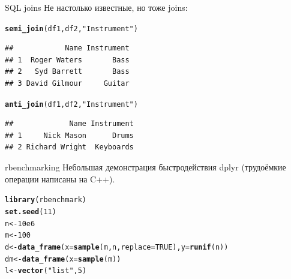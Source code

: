 \documentclass[compress, ucs]{beamer}\usepackage[]{graphicx}\usepackage[]{color}
\makeatletter
\newcommand{\hlnum}[1]{\textcolor[rgb]{0.686,0.059,0.569}{#1}}%
\newcommand{\hlstr}[1]{\textcolor[rgb]{0.192,0.494,0.8}{#1}}%
\newcommand{\hlstd}[1]{\textcolor[rgb]{0.345,0.345,0.345}{#1}}%
\newcommand{\hlkwb}[1]{\textcolor[rgb]{0.69,0.353,0.396}{#1}}%
\newcommand{\hlkwc}[1]{\textcolor[rgb]{0.333,0.667,0.333}{#1}}%
\newcommand{\hlkwd}[1]{\textcolor[rgb]{0.737,0.353,0.396}{\textbf{#1}}}%
\newenvironment{kframe}{%
 \def\at@end@of@kframe{}%
 \ifinner\ifhmode%
  \def\at@end@of@kframe{\end{minipage}}%
  \begin{minipage}{\columnwidth}%
 \fi\fi%
 \def\FrameCommand##1{\hskip\@totalleftmargin \hskip-\fboxsep
 \colorbox{shadecolor}{##1}\hskip-\fboxsep
     \hskip-\linewidth \hskip-\@totalleftmargin \hskip\columnwidth}%
 \MakeFramed {\advance\hsize-\width
   \@totalleftmargin\z@ \linewidth\hsize
   \@setminipage}}%
 {\par\unskip\endMakeFramed%
 \at@end@of@kframe}
\newenvironment{knitrout}{}{} %
\makeatother
\begin{document}
\begin{frame}[fragile]{SQL joins}
Не настолько известные, но тоже joins:
\begin{knitrout}\scriptsize
{}\color{fgcolor}\begin{kframe}
\begin{alltt}
\hlkwd{semi_join}\hlstd{(df1, df2,} \hlstr{"Instrument"}\hlstd{)}
\end{alltt}
\begin{verbatim}
##            Name Instrument
## 1  Roger Waters       Bass
## 2   Syd Barrett       Bass
## 3 David Gilmour     Guitar
\end{verbatim}
\begin{alltt}
\hlkwd{anti_join}\hlstd{(df1, df2,} \hlstr{"Instrument"}\hlstd{)}
\end{alltt}
\begin{verbatim}
##             Name Instrument
## 1     Nick Mason      Drums
## 2 Richard Wright  Keyboards
\end{verbatim}
\end{kframe}
\end{knitrout}
\end{frame}
\begin{frame}[fragile]{rbenchmarking}
Небольшая демонстрация быстродействия dplyr (трудоёмкие операции написаны на C++).
\begin{knitrout}\scriptsize
{}\color{fgcolor}\begin{kframe}
\begin{alltt}
\hlkwd{library}\hlstd{(rbenchmark)}
\hlkwd{set.seed}\hlstd{(}\hlnum{11}\hlstd{)}
\hlstd{n} \hlkwb{<-} \hlnum{10e6}
\hlstd{m} \hlkwb{<-} \hlnum{100}
\hlstd{d} \hlkwb{<-} \hlkwd{data_frame}\hlstd{(}\hlkwc{x} \hlstd{=} \hlkwd{sample}\hlstd{(m, n,} \hlkwc{replace}\hlstd{=}\hlnum{TRUE}\hlstd{),} \hlkwc{y} \hlstd{=} \hlkwd{runif}\hlstd{(n))}
\hlstd{dm} \hlkwb{<-} \hlkwd{data_frame}\hlstd{(}\hlkwc{x} \hlstd{=} \hlkwd{sample}\hlstd{(m))}
\hlstd{l} \hlkwb{<-} \hlkwd{vector}\hlstd{(}\hlstr{"list"}\hlstd{,} \hlnum{5}\hlstd{)}
\end{alltt}
\end{kframe}
\end{knitrout}
\end{frame}
\end{document}
